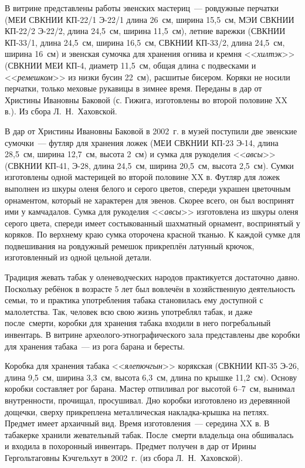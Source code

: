 В витрине представлены работы эвенских мастериц~--- ровдужные перчатки (МЕИ СВКНИИ КП-22/1 Э-22/1 длина 26~см, ширина 15,5~см, МЭИ СВКНИИ КП-22/2 Э-22/2, длина 24,5~см, ширина 11,5~см), летние варежки (СВКНИИ КП-33/1, длина 24,5~см, ширина 16,5~см, СВКНИИ КП-33/2, длина 24,5~см, ширина 16~см) и эвенская сумочка для хранения огнива и кремня <<\textit{хилтэк}>> (СВКНИИ МЕИ КП-4, диаметр 11,5~см, общая длина с подвесками и <<\textit{ремешком}>> из низки бусин 22~см), расшитые бисером. Коряки не носили перчатки, только меховые рукавицы в зимнее время. Переданы в дар от Христины Ивановны Баковой (с. Гижига, изготовлены во второй половине XX в.). Из сбора Л.~Н.~Хаховской.

В дар от Христины Ивановны Баковой в 2002~г. в музей поступили две эвенские сумочки~--- футляр для хранения ложек (МЕИ СВКНИИ КП-23 Э-14, длина 28,5~см, ширина 12,7~см, высота 2~см) и сумка для рукоделия <<\textit{авсы}>> (СВКНИИ КП-41, Э-28, длина 24,5~см, ширина 20,5~см, высота 2,5~см). Сумки изготовлены одной мастерицей во второй половине XX в. Футляр для ложек выполнен из шкуры оленя белого и серого цветов, спереди украшен цветочным орнаментом, который не характерен для эвенов. Скорее всего, он был воспринят ими у камчадалов. Сумка для рукоделия <<\textit{авсы}>> изготовлена из шкуры оленя серого цвета, спереди имеет состыкованный шахматный орнамент, воспринятый у коряков. По верхнему краю сумка оторочена красной тканью. К каждой сумке для подвешивания на ровдужный ремешок прикреплён латунный крючок, изготовленный из одной цельной детали.

Традиция жевать табак у оленеводческих народов практикуется достаточно давно. Поскольку ребёнок в возрасте 5 лет был вовлечён в хозяйственную деятельность семьи, то и практика употребления табака становилась ему доступной с малолетства. Так, человек всю свою жизнь употреблял табак, и даже после~смерти, коробки для хранения табака входили в него погребальный инвентарь. В витрине археолого-этнографического зала представлены две коробки для хранения табака~--- из рога барана и бересты.

Коробка для хранения табака <<\textit{ялепючгын}>> корякская (СВКНИИ КП-35 Э-26, длина 9,5~см, ширина 3,3~см, высота 6,3~см, длина по крышке 11,2~см). Основу коробки составляет рог барана. Мастер отпиливал рог высотой 6--7~см, вынимал внутренности, прочищал, просушивал. Дно коробки изготовлено из деревянной дощечки, сверху прикреплена металлическая накладка-крышка на петлях. Предмет имеет архаичный вид. Время изготовления~--- середина XX в. В табакерке хранили жевательный табак. После~смерти владельца она обшивалась и входила в похоронный инвентарь. Предмет получен в дар от Ирины Гергольтаговны Кэчгельхут в 2002~г. (из сбора Л.~Н.~Хаховской).

